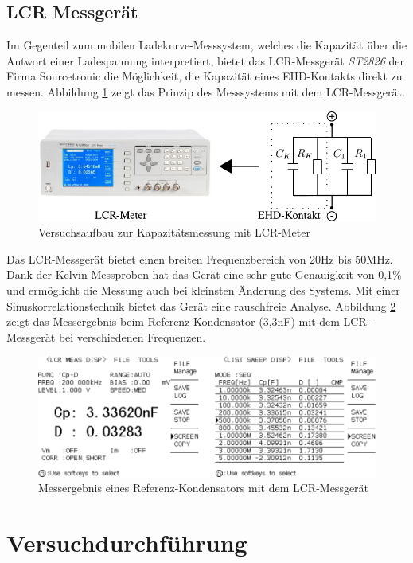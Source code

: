 \subsection{LCR Messgerät}
\label{sub:lcr_messgeraet}

Im Gegenteil zum mobilen Ladekurve-Messsystem, welches die Kapazität über die Antwort einer Ladespannung interpretiert, bietet das LCR-Messgerät \emph{ST2826} der Firma Sourcetronic die Möglichkeit, die Kapazität eines EHD-Kontakts direkt zu messen.
Abbildung \ref{fig:versuchsaufbau_zur_kapazitaetsmessung_mit_lcr_meter} zeigt das Prinzip des Messsystems mit dem LCR-Messgerät.
\begin{figure}[htb]
    \centering
    \includegraphics[]{./images/versuchsaufbau_mit_lcr_meter.pdf}
    \caption{Versuchsaufbau zur Kapazitätsmessung mit LCR-Meter}
    \label{fig:versuchsaufbau_zur_kapazitaetsmessung_mit_lcr_meter}
\end{figure}

Das LCR-Messgerät bietet einen breiten Frequenzbereich von 20Hz bis 50MHz.
Dank der Kelvin-Messproben hat das Gerät eine sehr gute Genauigkeit von 0,1\% und ermöglicht die Messung auch bei kleinsten Änderung des Systems.
Mit einer Sinuskorrelationstechnik bietet das Gerät eine rauschfreie Analyse.
Abbildung \ref{fig:messprobe_eines_mit_dem_lcr_meter} zeigt das Messergebnis beim Referenz-Kondensator (3,3nF) mit dem LCR-Messgerät bei verschiedenen Frequenzen.
\begin{figure}[htb]
    \centering
    \includegraphics[]{./images/messprobe_mit_lcr_meter.pdf}
    \caption{Messergebnis eines Referenz-Kondensators mit dem LCR-Messgerät}
    \label{fig:messprobe_eines_mit_dem_lcr_meter}
\end{figure}

\section{Versuchdurchführung}
\label{sec:versuchdurchfuehrung}

